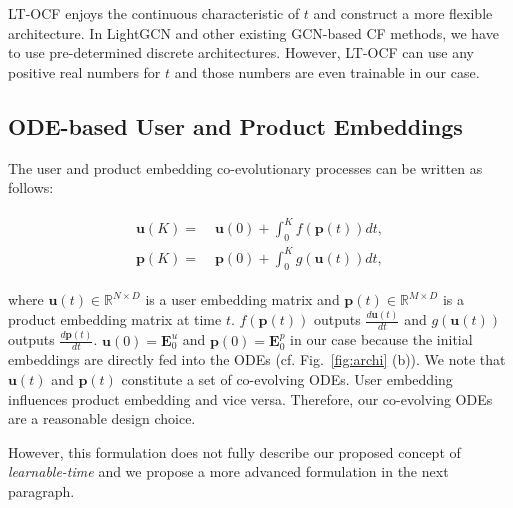 \documentclass[sigconf]{acmart}
\begin{document}
LT-OCF enjoys the continuous characteristic of $t$ and construct a more flexible architecture. In LightGCN and other existing GCN-based CF methods, we have to use pre-determined discrete architectures. However, LT-OCF can use any positive real numbers for $t$ and those numbers are even trainable in our case.

\subsection{ODE-based User and Product Embeddings} The user and product embedding co-evolutionary processes can be written as follows:
\begin{linenomath*}\begin{align}\begin{split}\label{eq:panode}
    \bm{u}(K) =&\; \bm{u}(0) + \int_{0}^{K}f(\bm{p}(t))dt,\\
    \bm{p}(K) =&\; \bm{p}(0) + \int_{0}^{K}g(\bm{u}(t))dt,
\end{split}\end{align}\end{linenomath*}where $\bm{u}(t) \in \mathbb{R}^{N \times D}$ is a user embedding matrix and $\bm{p}(t) \in \mathbb{R}^{M \times D}$ is a product embedding matrix at time $t$. $f(\bm{p}(t))$ outputs $\frac{d \bm{u}(t)}{dt}$ and $g(\bm{u}(t))$ outputs $\frac{d \bm{p}(t)}{dt}$. $\bm{u}(0) = \bm{E}^u_0$ and $\bm{p}(0) = \bm{E}^p_0$ in our case because the initial embeddings are directly fed into the ODEs (cf. Fig.~\ref{fig:archi} (b)). We note that $\bm{u}(t)$ and $\bm{p}(t)$ constitute a set of co-evolving ODEs. User embedding influences product embedding and vice versa. Therefore, our co-evolving ODEs are a reasonable design choice.

However, this formulation does not fully describe our proposed concept of \emph{learnable-time} and we propose a more advanced formulation in the next paragraph. 
\end{document}
